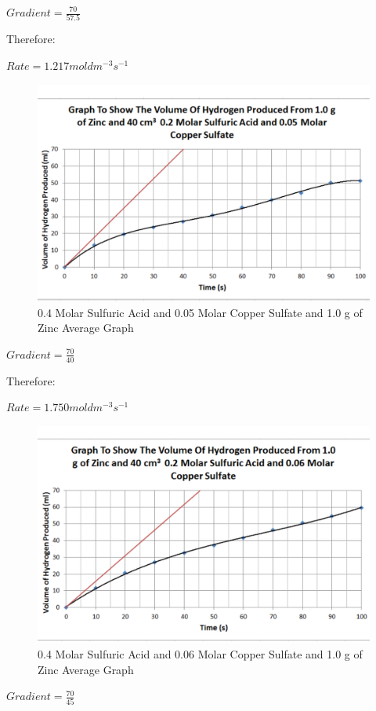 $Gradient = \frac{70}{57.5}$

Therefore:

$Rate = 1.217 mol dm^{-3} s^{-1}$

\begin{figure}[H]
    \includegraphics[width=\textwidth]{./Analysis/Images/3VaryCopperSulfate/005Molar.pdf}
    \caption{0.4 Molar Sulfuric Acid and 0.05 Molar Copper Sulfate and 1.0 g of Zinc Average Graph} \label{fig:005VaryCopperSulfate}
\end{figure}

$Gradient = \frac{70}{40}$

Therefore:

$Rate = 1.750 mol dm^{-3} s^{-1}$

\begin{figure}[H]
    \includegraphics[width=\textwidth]{./Analysis/Images/3VaryCopperSulfate/006Molar.pdf}
    \caption{0.4 Molar Sulfuric Acid and 0.06 Molar Copper Sulfate and 1.0 g of Zinc Average Graph} \label{fig:006VaryCopperSulfate}
\end{figure}
$Gradient = \frac{70}{45}$

